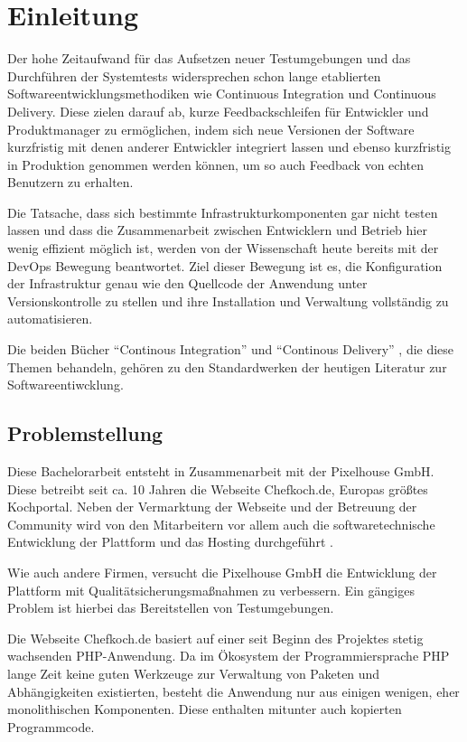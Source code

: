 \section{Einleitung}

Der hohe Zeitaufwand für das Aufsetzen neuer Testumgebungen und das Durchführen der Systemtests widersprechen schon lange etablierten Softwareentwicklungsmethodiken wie Continuous Integration und Continuous Delivery. Diese zielen darauf ab, kurze Feedbackschleifen für Entwickler und Produktmanager zu ermöglichen, indem sich neue Versionen der Software kurzfristig mit denen anderer Entwickler integriert lassen und ebenso kurzfristig in Produktion genommen werden können, um so auch Feedback von echten Benutzern zu erhalten.

Die Tatsache, dass sich bestimmte Infrastrukturkomponenten gar nicht testen lassen und dass die Zusammenarbeit zwischen Entwicklern und Betrieb hier wenig effizient möglich ist, werden von der Wissenschaft heute bereits mit der DevOps Bewegung beantwortet. Ziel dieser Bewegung ist es, die Konfiguration der Infrastruktur genau wie den Quellcode der Anwendung unter Versionskontrolle zu stellen und ihre Installation und Verwaltung vollständig zu automatisieren.

Die beiden Bücher "`Continous Integration"' \citep{DuvMatAnd07} und "`Continous Delivery"' \citep{HumFar10}, die diese Themen behandeln, gehören zu den Standardwerken der heutigen Literatur zur Softwareentiwcklung.

\subsection{Problemstellung}

Diese Bachelorarbeit entsteht in Zusammenarbeit mit der Pixelhouse GmbH. Diese betreibt seit ca. 10 Jahren die Webseite Chefkoch.de, Europas größtes Kochportal. Neben der Vermarktung der Webseite und der Betreuung der Community wird von den Mitarbeitern vor allem auch die softwaretechnische Entwicklung der Plattform und das Hosting durchgeführt \citep[Vgl.][]{pixelhouse14}.

Wie auch andere Firmen, versucht die Pixelhouse GmbH die Entwicklung der Plattform mit Qualitätsicherungsmaßnahmen zu verbessern. Ein gängiges Problem ist hierbei das Bereitstellen von Testumgebungen.

Die Webseite Chefkoch.de basiert auf einer seit Beginn des Projektes stetig wachsenden PHP-Anwendung. Da im Ökosystem der Programmiersprache PHP lange Zeit keine guten Werkzeuge zur Verwaltung von Paketen und Abhängigkeiten existierten, besteht die Anwendung nur aus einigen wenigen, eher monolithischen Komponenten. Diese enthalten mitunter auch kopierten Programmcode.

